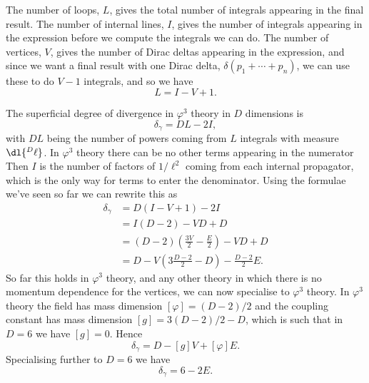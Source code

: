 \documentclass[fleqn]{NotesClass}
\begin{document}
    The number of loops, \(L\), gives the total number of integrals appearing in the final result.
    The number of internal lines, \(I\), gives the number of integrals appearing in the expression before we compute the integrals we can do.
    The number of vertices, \(V\), gives the number of Dirac deltas appearing in the expression, and since we want a final result with one Dirac delta, \(\delta(p_1 + \dotsb + p_n)\), we can use these to do \(V - 1\) integrals, and so we have
    \begin{equation}
        L = I - V + 1.
    \end{equation}
    
    The superficial degree of divergence in \(\varphi^3\) theory in \(D\) dimensions is
    \begin{equation}
        \delta_\gamma = DL - 2I,
    \end{equation}
    with \(DL\) being the number of powers coming from \(L\) integrals with measure \(\dl{^D\ell}\).
    In \(\varphi^3\) theory there can be no other terms appearing in the numerator
    Then \(I\) is the number of factors of \(1/\ell^2\) coming from each internal propagator, which is the only way for terms to enter the denominator.
    Using the formulae we've seen so far we can rewrite this as
    \begin{align}
        \delta_\gamma &= D(I - V + 1) - 2I\\
        &= I(D - 2) - VD + D\\
        &= (D - 2)\left( \frac{3V}{2} - \frac{E}{2} \right) - VD + D\\
        &= D - V\left( 3 \frac{D - 2}{2} - D \right) - \frac{D - 2}{2}E.
    \end{align}
    So far this holds in \(\varphi^3\) theory, and any other theory in which there is no momentum dependence for the vertices, we can now specialise to \(\varphi^3\) theory.
    In \(\varphi^3\) theory the field has mass dimension \([\varphi] = (D - 2)/2\) and the coupling constant has mass dimension \([g] = 3(D-2)/2 - D\), which is such that in \(D = 6\) we have \([g] = 0\).
    Hence
    \begin{equation}
        \delta_\gamma = D - [g] V + [\varphi] E.
    \end{equation}
    Specialising further to \(D = 6\) we have
    \begin{equation}
        \delta_\gamma = 6 - 2E.
    \end{equation}
    
\end{document}
